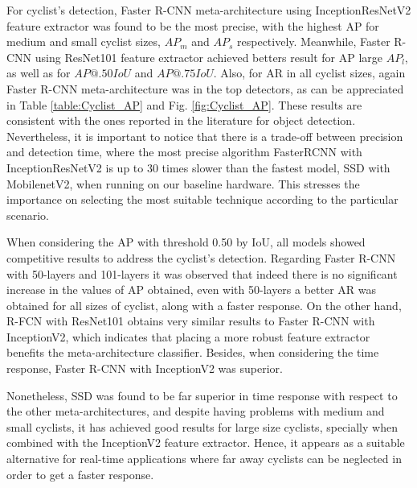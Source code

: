 \documentclass[journal]{IEEEtran}
\begin{document}
For cyclist's detection, Faster R-CNN meta-architecture using InceptionResNetV2 feature extractor was found to be the most precise, with the highest AP for medium and small cyclist sizes, $AP_{m}$ and $AP_{s}$ respectively. Meanwhile, Faster R-CNN using ResNet101 feature extractor achieved betters result for AP large $AP_{l}$, as well as for $AP@.50IoU$ and $AP@.75IoU$. Also, for AR in all cyclist sizes, again Faster R-CNN meta-architecture was in the top detectors, as can be appreciated in Table \ref{table:Cyclist_AP} and Fig. \ref{fig:Cyclist_AP}. These results are consistent with the ones reported in the literature for object detection. Nevertheless, it is important to notice that there is a trade-off between precision and detection time, where the most precise algorithm FasterRCNN with InceptionResNetV2 is up to $30$ times slower than the fastest model, SSD with MobilenetV2, when running on our baseline hardware. This stresses the importance on selecting the most suitable technique according to the particular scenario. 

When considering the AP with threshold 0.50 by IoU, all models showed competitive results to address the cyclist's detection. Regarding Faster R-CNN with 50-layers and 101-layers it was observed that indeed there is no significant increase in the values of AP obtained, even with 50-layers a better AR was obtained for all sizes of cyclist, along with a faster response. On the other hand, R-FCN with ResNet101 obtains very similar results to Faster R-CNN with InceptionV2, which indicates that placing a more robust feature extractor benefits the meta-architecture classifier. Besides, when considering the time response, Faster R-CNN with InceptionV2 was superior.

Nonetheless, SSD was found to be far superior in time response with respect to the other meta-architectures, and despite having problems with medium and small cyclists, it has achieved good results for large size cyclists, specially when combined with the InceptionV2 feature extractor. Hence, it appears as a suitable alternative for real-time applications where far away cyclists can be neglected in order to get a faster response.
\end{document}
